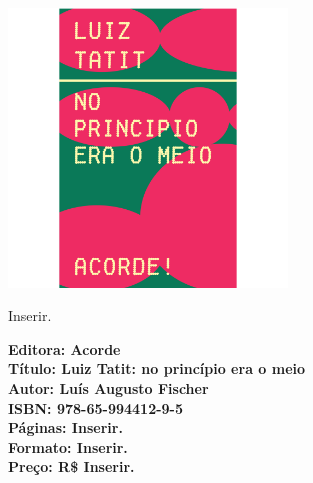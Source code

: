 \pagestyle{acorde}
\label{acorde}

\begin{center}
\hspace*{.5cm}\includegraphics[width=74mm]{./CAPAS/ACORDE_TATIT.jpg}
\end{center}
\hspace*{-7cm}\hrulefill\hspace*{-7cm}
\medskip

\noindent{}Inserir.

\vfill
\hspace*{-.4cm}\begin{minipage}[c]{.5\linewidth}
\small\textbf{
\hspace*{-.1cm}Editora: Acorde\\
Título: Luiz Tatit: no princípio era o meio\\
Autor: Luís Augusto Fischer\\ 
ISBN: 978-65-994412-9-5\\
Páginas: Inserir.\\
Formato: Inserir.\\
Preço: R\$ Inserir.\\
}
\end{minipage}
\pagebreak

